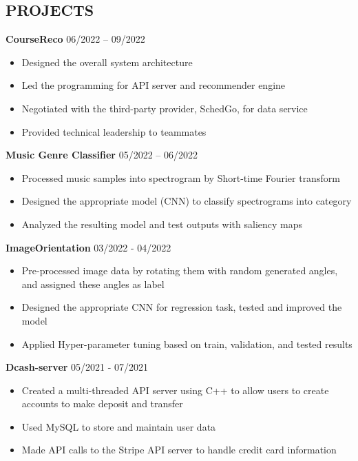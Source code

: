 \documentclass[margin,line]{res}
\begin{document}
\begin{resume}
\section{\sc PROJECTS}
\textbf{CourseReco} \hfill {06/2022 -- 09/2022} \\
\begin{itemize}
	\item Designed the overall system architecture
	\item Led the programming for API server and recommender engine
	\item Negotiated with the third-party provider, SchedGo, for data service
	\item Provided technical leadership to teammates 
\end{itemize}

\textbf{Music Genre Classifier} \hfill {05/2022 -- 06/2022} \\
\begin{itemize}
	\item Processed music samples into spectrogram by Short-time Fourier transform
	\item Designed the appropriate model (CNN) to classify spectrograms into category
	\item Analyzed the resulting model and test outputs with saliency maps
\end{itemize}

\textbf{ImageOrientation} \hfill {03/2022 - 04/2022} \\
\begin{itemize}
	\item Pre-processed image data by rotating them with random generated angles, and assigned these angles as label
	\item Designed the appropriate CNN for regression task, tested and improved the model
	\item Applied Hyper-parameter tuning based on train, validation, and tested results 
\end{itemize}

\textbf{Dcash-server} \hfill {05/2021 - 07/2021} \\
\begin{itemize}
	\item Created a multi-threaded API server using C++ to allow users to create accounts to make deposit and transfer
	\item Used MySQL to store and maintain user data
	\item Made API calls to the Stripe API server to handle credit card information
\end{itemize}


\end{resume}
\end{document}
